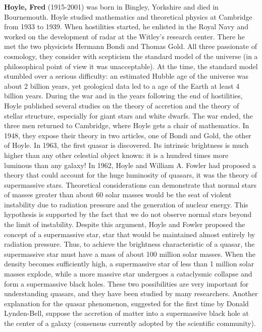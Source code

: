 \textbf{Hoyle, Fred} (1915-2001) was born in Bingley, Yorkshire and died in Bournemouth. Hoyle studied mathematics and theoretical physics at Cambridge from 1933 to 1939. When hostilities started, he enlisted in the Royal Navy and worked on the development of radar at the Witley's research center. There he met the two physicists Hermann Bondi and Thomas Gold. All three passionate of cosmology, they consider with scepticism the standard model of the universe (in a philosophical point of view it was unacceptable). At the time, the standard model stumbled over a serious difficulty: an estimated Hubble age of the universe was about 2 billion years, yet geological data led to a age of the Earth at least 4 billion years. During the war and in the years following the end of hostilities, Hoyle published several studies on the theory of accretion and the theory of stellar structure, especially for giant stars and white dwarfs. The war ended, the three men returned to Cambridge, where Hoyle gets a chair of mathematics. In 1948, they expose their theory in two articles, one of Bondi and Gold, the other of Hoyle. In 1963, the first quasar is discovered. Its intrinsic brightness is much higher than any other celestial object known: it is a hundred times more luminous than any galaxy! In 1962, Hoyle and William A. Fowler had proposed a theory that could account for the huge luminosity of quasars, it was the theory of supermassive stars. Theoretical considerations can demonstrate that normal stars of masses greater than about 60 solar masses would be the seat of violent instability due to radiation pressure and the generation of nuclear energy. This hypothesis is supported by the fact that we do not observe normal stars beyond the limit of instability. Despite this argument, Hoyle and Fowler proposed the concept of a supermassive star, star that would be maintained almost entirely by radiation pressure. Thus, to achieve the brightness characteristic of a quasar, the supermassive star must have a mass of about 100 million solar masses. When the density becomes sufficiently high, a supermassive star of less than 1 million solar masses explode, while a more massive star undergoes a cataclysmic collapse and form a supermassive black holes. These two possibilities are very important for understanding quasars, and they have been studied by many researchers. Another explanation for the quasar phenomenon, suggested for the first time by Donald Lynden-Bell, suppose the accretion of matter into a supermassive black hole at the center of a galaxy (consensus currently adopted by the scientific community).

